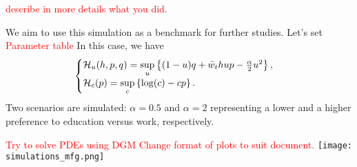         \textcolor{red}{describe in more details what you did.}
        
        We aim to use this simulation as a benchmark for further studies.        
        Let's set \textcolor{red}{Parameter table}
        In this case, we have 
        \begin{equation}
            \begin{cases}    
            \mathcal{H}_u(h,p,q) = \sup\limits_{u} \left\{ (1 - u)q + \bar w_t h u p - \frac{\alpha}{2} u^2 \right\},\\
            \mathcal{H}_c (p) = \sup\limits_{c} \left\{ \log(c) - cp \right\}.
            \end{cases}
        \end{equation} 
        Two scenarios are simulated: $\alpha = 0.5$ and  $\alpha = 2$ representing a lower and a higher preference to education versus work, respectively.

        \textcolor{red}{Try to solve PDEs using DGM}
        \textcolor{red}{Change format of plots to suit document.}
        \texttt{[image: simulations\_mfg.png]}